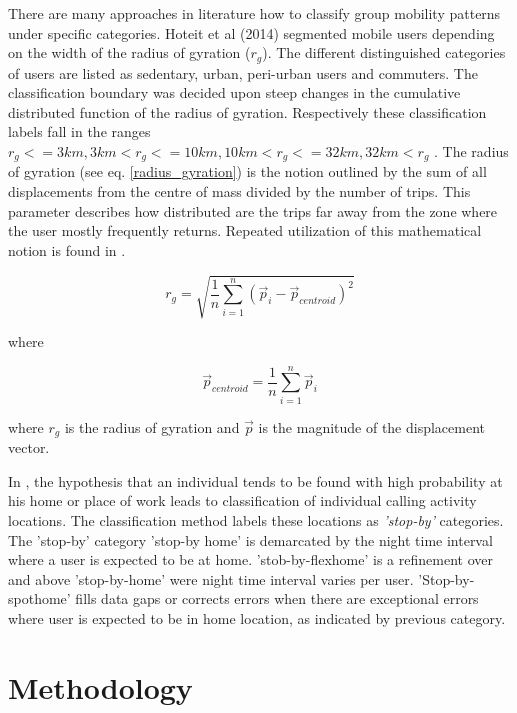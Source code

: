 \documentclass[12pt, a4paper]{report}
\theoremstyle{definition}
\theoremstyle{definition}%
\theoremstyle{definition}%
\theoremstyle{definition}%
\theoremstyle{definition}%
\theoremstyle{definition}%
\begin{document}
There are many approaches in literature how to classify group mobility patterns under specific categories. Hoteit et al (2014) segmented mobile users depending on the width of the radius of gyration (\(r_{g}\)). The different distinguished categories of users are listed as sedentary, urban, peri-urban users and commuters. The classification boundary was decided upon steep changes in the cumulative distributed function of the radius of gyration. Respectively these classification labels fall in the ranges \(r_{g} <= 3km, 3km < r_{g} <= 10km, 10km < r_{g} <= 32km, 32km < r_{g}\) \cite{Hoteit2014}. The radius of gyration (see eq. \ref{radius_gyration}) is the notion outlined by the sum of all displacements from the centre of mass divided by the number of trips. This parameter describes how distributed are the trips far away from the zone where the user mostly frequently returns. Repeated utilization of this mathematical notion is found in \cite{Hoteit2014,Gonzalez2008,Hoteit2016}.

\begin{equation} \label{radius_gyration}
r_{g} = \sqrt{\frac{1}{n}\sum _{i=1}^{n}({\stackrel{\to }{p}}_{i}-{\stackrel{\to }{p}}_{centroid})^2}
\end{equation}

where 

\begin{equation}
{\stackrel{\to }{p}}_{centroid} = \frac{1}{n}\sum _{i=1}^{n}{\stackrel{\to }{p}}_{i}
\end{equation}

where $r_{g}$ is the radius of gyration and ${\stackrel{\to }{p}}$ is the magnitude of the displacement vector.   

In \cite{Hoteit2016}, the hypothesis that an individual tends to be found with high probability at his home or place of work leads to classification of individual calling activity locations. The classification method labels these locations as \textit{'stop-by'} categories. The 'stop-by' category 'stop-by home' is demarcated by the night time interval where a user is expected to be at home. 'stob-by-flexhome' is a refinement over and above 'stop-by-home' were night time interval varies per user. 'Stop-by-spothome' fills data gaps or corrects errors when there are exceptional errors where user is expected to be in home location, as indicated by previous category.



\chapter{Methodology} \label{chapter:methodology}
\end{document}
